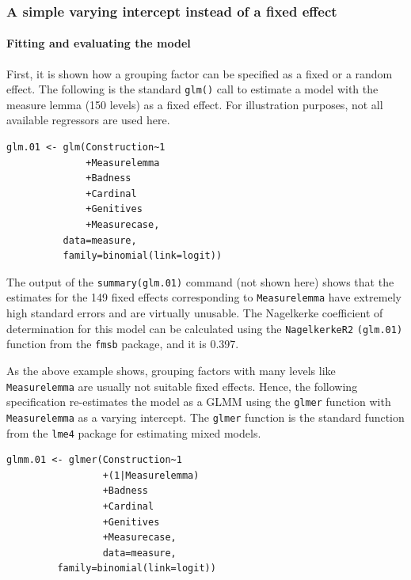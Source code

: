 \subsubsection{A simple varying intercept instead of a fixed effect}

\paragraph{Fitting and evaluating the model}

First, it is shown how a grouping factor can be specified as a fixed or a random effect.
The following is the standard \texttt{glm()} call to estimate a model with the measure lemma (150 levels) as a fixed effect.
For illustration purposes, not all available regressors are used here.

\vspace{0.5\baselineskip}

\begin{lstlisting}
glm.01 <- glm(Construction~1
              +Measurelemma
              +Badness
              +Cardinal
              +Genitives
              +Measurecase,
	      data=measure,
	      family=binomial(link=logit))
\end{lstlisting}

The output of the \texttt{summary(glm.01)} command (not shown here) shows that the estimates for the 149 fixed effects corresponding to \texttt{Measurelemma} have extremely high standard errors and are virtually unusable.
The Nagelkerke coefficient of determination for this model can be calculated using the \texttt{NagelkerkeR2} \texttt{(glm.01)} function from the \texttt{fmsb} package, and it is 0.397.

As the above example shows, grouping factors with many levels like \texttt{Measurelemma} are usually not suitable fixed effects.
Hence, the following specification re-estimates the model as a GLMM using the \texttt{glmer} function with \texttt{Measurelemma} as a varying intercept.
The \texttt{glmer} function is the standard function from the \texttt{lme4} package for estimating mixed models.

\vspace{0.5\baselineskip}

\begin{lstlisting}
glmm.01 <- glmer(Construction~1
                 +(1|Measurelemma)
                 +Badness
                 +Cardinal
                 +Genitives
                 +Measurecase,
                 data=measure,
		 family=binomial(link=logit))
\end{lstlisting}


